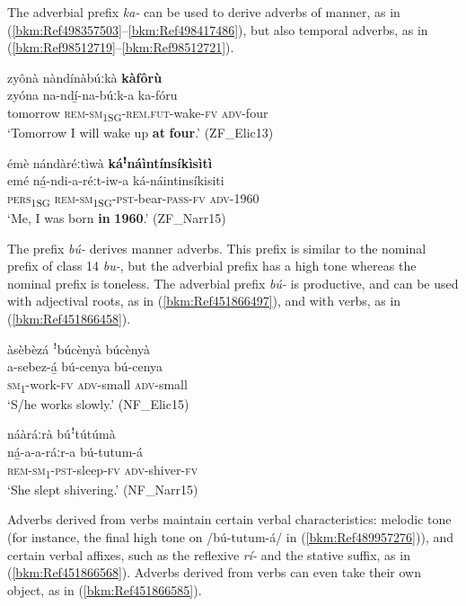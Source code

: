 The adverbial prefix \textit{ka-} can be used to derive adverbs of manner, as in (\ref{bkm:Ref498357503}--\ref{bkm:Ref498417486}), but also temporal adverbs, as in (\ref{bkm:Ref98512719}--\ref{bkm:Ref98512721}).

\ea
\label{bkm:Ref98512719}
zyônà nàndínàbúːkà \textbf{kàfôrù}\\
\gll zyóna    na-ndí̲-na-búːk-a      ka-fóru\\
tomorrow  \textsc{rem}-\textsc{sm}\textsubscript{1SG}-\textsc{rem}.\textsc{fut}-wake-\textsc{fv}  \textsc{adv}-four\\
\glt ‘Tomorrow I will wake up \textbf{at} \textbf{four}.’ (ZF\_Elic13)
\z

\ea
\label{bkm:Ref98512721}
émè nándàréːtìwà \textbf{káꜝ}\textbf{náìntínsíkìsìtì}\\
\gll emé    ná̲-ndi-a-réːt-iw-a      ká-náintinsíkisiti\\
\textsc{pers}\textsubscript{1SG}  \textsc{rem}-\textsc{sm}\textsubscript{1SG}-\textsc{pst}-bear-\textsc{pass}-\textsc{fv}  \textsc{adv}-1960\\
\glt ‘Me, I was born \textbf{in} \textbf{1960}.’ (ZF\_Narr15)
\z

The prefix \textit{bú-} derives manner adverbs. This prefix is similar to the nominal prefix of class 14 \textit{bu-}, but the adverbial prefix has a high tone whereas the nominal prefix is toneless. The adverbial prefix \textit{bú-} is productive, and can be used with adjectival roots, as in (\ref{bkm:Ref451866497}), and with verbs, as in (\ref{bkm:Ref451866458}).

\ea
\label{bkm:Ref451866497}
àsèbèzá ꜝbúcènyà búcènyà\\
\gll a-sebez-á̲  bú-cenya  bú-cenya\\
\textsc{sm}\textsubscript{1}-work-\textsc{fv}  \textsc{adv}-small  \textsc{adv}-small\\
\glt ‘S/he works slowly.’ (NF\_Elic15)
\z

\ea
\label{bkm:Ref451866458}
\label{bkm:Ref489957276}náàráːrà búꜝtútúmà\\
\gll ná̲-a-a-ráːr-a      bú-tutum-á\\
\textsc{rem}-\textsc{sm}\textsubscript{1}-\textsc{pst}-sleep-\textsc{fv}  \textsc{adv}-shiver-\textsc{fv}\\
\glt ‘She slept shivering.’ (NF\_Narr15)
\z

Adverbs derived from verbs maintain certain verbal characteristics: melodic tone (for instance, the final high tone on /bú-tutum-á/ in (\ref{bkm:Ref489957276})), and certain verbal affixes, such as the reflexive \textit{rí-} and the stative suffix, as in (\ref{bkm:Ref451866568}). Adverbs derived from verbs can even take their own object, as in (\ref{bkm:Ref451866585}).

